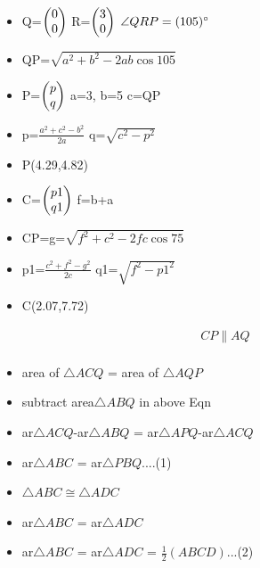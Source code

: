 \begin{frame}
\begin{itemize}
\item Q=$\begin{pmatrix}0\\0\end{pmatrix}$    R=$\begin{pmatrix}3\\0\end{pmatrix}$   $\angle{QRP}=(105)\degree$\\
\item QP=$\sqrt{a^2+b^2-2ab\cos{105}}$
\item P=$\begin{pmatrix}p\\q\end{pmatrix}$  a=3, b=5 c=QP\\
\item p=$\frac{a^2+c^2-b^2}{2a}$    q=$\sqrt{c^2-p^2}$\\
\item P(4.29,4.82)
\item C=$\begin{pmatrix}p1\\q1\end{pmatrix}$  f=b+a\\
\item CP=g=$\sqrt{f^2+c^2-2fc\cos{75}}$
\item p1=$\frac{c^2+f^2-g^2}{2c}$    q1=$\sqrt{f^2-p1^2}$\\
\item C(2.07,7.72)
\end{itemize}
\end{frame}
\begin{frame}
\begin{align*}
CP \parallel AQ\\
\end{align*}
\begin{itemize}
\item area of $\triangle{ACQ}$ =  area of $\triangle{AQP}$\\

\item subtract area$\triangle{ABQ}$ in above Eqn\\

\item ar$\triangle{ACQ}$-ar$\triangle{ABQ}$ = ar$\triangle{APQ}$-ar$\triangle{ACQ}$\\

\item ar$\triangle{ABC}$ = ar$\triangle{PBQ}$....(1)\\

\item $\triangle{ABC} \cong \triangle{ADC}$\\

\item ar$\triangle{ABC}$ = ar$\triangle{ADC}$\\

\item ar$\triangle{ABC}$ = ar$\triangle{ADC}$ = $\frac{1}{2}(ABCD)$...(2)\\
\end{itemize}
\end{frame}
